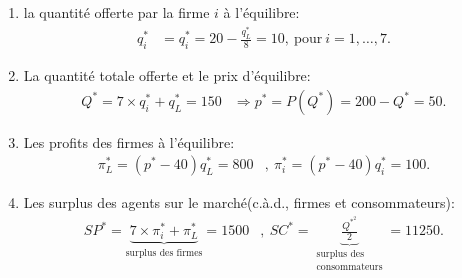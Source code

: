 \documentclass[notes, ignorenonframetext, compress, 10pt, xcolor=svgnames, aspectratio=169]{beamer}
\begin{document}
\begin{frame}[allowframebreaks]{\insertsection}
\begin{enumerate}[$\star$]
\begin{enumerate}[$\star$]
               \item la quantité offerte par la firme $i$ à l'équilibre: 
               \begin{align*}
                q_i^* &= q_i^* = 20 -\frac{q_L^*}{8} = 10, \ \text{pour} \ i=1, \ldots, 7.
               \end{align*}
               \item La quantité totale offerte et le prix d'équilibre:
               \begin{align*}
                Q^* = 7\times q_i^* + q_L^* = 150 &\Rightarrow p^* = P(Q^*) = 200-Q^* = 50.
               \end{align*}
               \item Les profits des firmes à l'équilibre:
               \begin{align*}
               \pi_L^* = (p^* - 40)q_L^* = 800&, \ \pi_i^* = (p^* - 40)q_i^* = 100.
               \end{align*}
               \item  Les surplus des agents sur le marché(c.à.d., firmes et consommateurs):
               \begin{align*}
                   SP^* = \underbrace{7\times \pi_i^* + \pi_L^*}_{\text{surplus des firmes}} = 1500&, \ 
                   SC^* =  \underbrace{\frac{Q^{*^2}}{2}}_{\substack{\text{surplus des }\\
                   \text{consommateurs}}} = 11250.
               \end{align*}
            
             \end{enumerate}
            \end{enumerate}
            
\end{frame}
\end{document}
